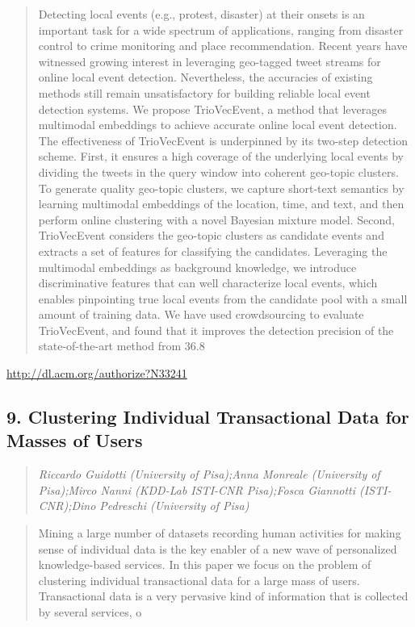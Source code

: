\documentclass{article}
\begin{document}
\begin{quote}
Detecting local events (e.g., protest, disaster) at their onsets is an important task for a wide spectrum of applications, ranging from disaster control to crime monitoring and place recommendation. Recent years have witnessed growing interest in leveraging geo-tagged tweet streams for online local event detection. Nevertheless, the accuracies of existing methods still remain unsatisfactory for building reliable local event detection systems. We propose TrioVecEvent, a method that leverages multimodal embeddings to achieve accurate online local event detection. The effectiveness of TrioVecEvent is underpinned by its two-step detection scheme. First, it ensures a high coverage of the underlying local events by dividing the tweets in the query window into coherent geo-topic clusters. To generate quality geo-topic clusters, we capture short-text semantics by learning multimodal embeddings of the location, time, and text, and then perform online clustering with a novel Bayesian mixture model. Second, TrioVecEvent considers the geo-topic clusters as candidate events and extracts a set of features for classifying the candidates. Leveraging the multimodal embeddings as background knowledge, we introduce discriminative features that can well characterize local events, which enables pinpointing true local events from the candidate pool with a small amount of training data. We have used crowdsourcing to evaluate TrioVecEvent, and found that it improves the detection precision of the state-of-the-art method from 36.8%
\end{quote}

\href{http://dl.acm.org/authorize?N33241}{http://dl.acm.org/authorize?N33241}

\subsection{9. Clustering Individual Transactional Data for Masses of Users}

\begin{quote}
\footnotesize{\textit{Riccardo Guidotti (University of Pisa);Anna Monreale (University of Pisa);Mirco Nanni (KDD-Lab ISTI-CNR Pisa);Fosca Giannotti (ISTI-CNR);Dino Pedreschi (University of Pisa)}}

\end{quote}

\begin{quote}
Mining a large number of datasets recording human activities for making sense of individual data is the key enabler of a new wave of personalized knowledge-based services. In this paper we focus on the problem of clustering individual transactional data for a large mass of users. Transactional data is a very pervasive kind of information that is collected by several services, o
\end{quote}
\end{document}

